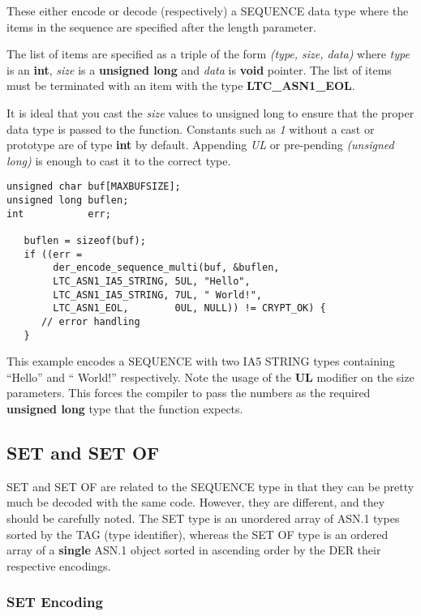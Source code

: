 \documentclass[synpaper]{book}
\begin{document}
These either encode or decode (respectively) a SEQUENCE data type where the items in the sequence are specified after the length parameter.

The list of items are specified as a triple of the form \textit{(type, size, data)}  where \textit{type} is an \textbf{int}, \textit{size} is a \textbf{unsigned long}
and \textit{data} is \textbf{void} pointer.  The list of items must be terminated with an item with the type \textbf{LTC\_ASN1\_EOL}.

It is ideal that you cast the \textit{size} values to unsigned long to ensure that the proper data type is passed to the function.  Constants such as \textit{1} without
a cast or prototype are of type \textbf{int} by default.  Appending \textit{UL} or pre-pending \textit{(unsigned long)} is enough to cast it to the correct type.

\begin{small}
\begin{verbatim}
unsigned char buf[MAXBUFSIZE];
unsigned long buflen;
int           err;

   buflen = sizeof(buf);
   if ((err = 
        der_encode_sequence_multi(buf, &buflen,
        LTC_ASN1_IA5_STRING, 5UL, "Hello",
        LTC_ASN1_IA5_STRING, 7UL, " World!",
        LTC_ASN1_EOL,        0UL, NULL)) != CRYPT_OK) {
      // error handling
   }
\end{verbatim}
\end{small}

This example encodes a SEQUENCE with two IA5 STRING types containing ``Hello'' and `` World!'' respectively.  Note the usage of the \textbf{UL} modifier
on the size parameters.  This forces the compiler to pass the numbers as the required \textbf{unsigned long} type that the function expects.

\subsection{SET and SET OF}

 
SET and SET OF are related to the SEQUENCE type in that they can be pretty much be decoded with the same code.  However, they are different, and they should
be carefully noted.  The SET type is an unordered array of ASN.1 types sorted by the TAG (type identifier), whereas the SET OF type is an ordered array of 
a \textbf{single} ASN.1 object sorted in ascending order by the DER their respective encodings.

\subsubsection{SET Encoding}
\end{document}
